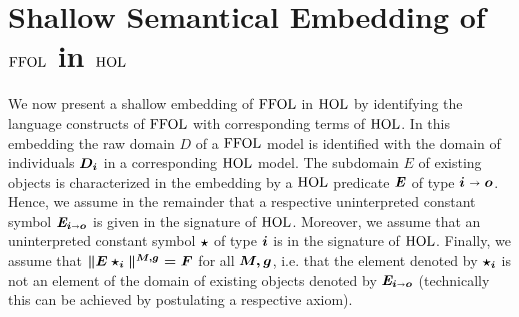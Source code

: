 \section{Shallow Semantical Embedding of $\text{\textrm{FFOL}}$ in $\text{\textrm{HOL}}$}
We now present a shallow embedding of $\text{\textrm{FFOL}}$ in $\text{\textrm{HOL}}$ by identifying
the language constructs of $\text{\textrm{FFOL}}$ with corresponding terms of $\text{\textrm{HOL}}$.
In this embedding the raw domain $D$ of a $\text{\textrm{FFOL}}$ model is
identified with the domain of individuals $\boldsymbol{D_i}$ in a corresponding $\text{\textrm{HOL}}$ model.  The subdomain $E$ of
existing objects is characterized in the embedding by a $\text{\textrm{HOL}}$
predicate $\boldsymbol{\mathit{E}}$ of type $\boldsymbol{ i\shortrightarrow o}$. Hence, we assume in the
remainder that a respective uninterpreted constant symbol
$\boldsymbol{\mathit{E}_{i\shortrightarrow o}}$
is given in the signature of $\text{\textrm{HOL}}$. Moreover, we assume that an
uninterpreted constant symbol $\boldsymbol{\star}$ of type $\boldsymbol{i}$ is in the
signature of $\text{\textrm{HOL}}$. Finally, we assume that $\boldsymbol{\|E \star_i\|^{M,g}=F}$ for
all $\boldsymbol{M,g}$, i.e. that the element denoted by $\boldsymbol{\star_i}$ is not
an element of the domain of existing objects denoted by
$\boldsymbol{\mathit{E}_{i\shortrightarrow o}}$ (technically this can be achieved by postulating
a respective axiom).

